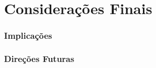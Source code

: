 \chapter{Considerações Finais}
\label{cap:cap7}


\subsection{Implicações}
\begin{comment}
	Discuta as implicações dos resultados do seu experimento e sua importância para a área de estudo. Isso pode incluir insights teóricos, aplicações práticas ou contribuições para o conhecimento existente.
\end{comment}

\subsection{Direções Futuras}
\begin{comment}
	Por fim, sugira possíveis direções para pesquisas futuras com base nos resultados do seu experimento. Identifique lacunas que ainda precisam ser exploradas ou questões que surgiram durante o estudo e que merecem investigação adicional.
\end{comment}



\blindtext[1]
